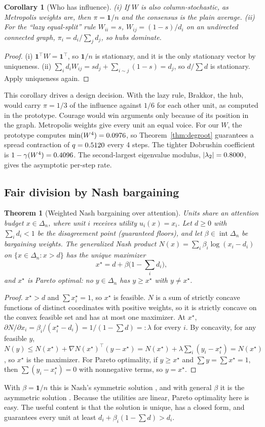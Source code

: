 \documentclass[11pt]{article}
\newtheorem{theorem}{Theorem}
\newtheorem{corollary}{Corollary}
\theoremstyle{definition}
\theoremstyle{remark}
\newcommand{\Simp}{\Delta}
\newcommand{\one}{\mathbf{1}}
\begin{document}
\begin{corollary}[Who has influence]\label{cor:pi}
(i) If $W$ is also column-stochastic, as Metropolis weights are, then $\pi=\one/n$ and the consensus is the plain average. (ii) For the ``lazy equal-split'' rule $W_{ii}=s$, $W_{ij}=(1-s)/d_i$ on an undirected connected graph, $\pi_i=d_i/\sum_jd_j$, so hubs dominate.
\end{corollary}
\begin{proof}
(i) $\one^\top W=\one^\top$, so $\one/n$ is stationary, and it is the only stationary vector by uniqueness. (ii) $\sum_id_iW_{ij}=sd_j+\sum_{i\sim j}(1-s)=d_j$, so $d/\sum d$ is stationary. Apply uniqueness again.
\end{proof}
This corollary drives a design decision. With the lazy rule, Brakkor, the hub, would carry $\pi=1/3$ of the influence against $1/6$ for each other unit, as computed in the prototype. Courage would win arguments only because of its position in the graph. Metropolis weights give every unit an equal voice. For our $W$, the prototype computes $\min(W^4)=0.0976$, so Theorem~\ref{thm:degroot} guarantees a spread contraction of $q=0.5120$ every 4 steps. The tighter Dobrushin coefficient is $1-\gamma(W^4)=0.4096$. The second-largest eigenvalue modulus, $|\lambda_2|=0.8000$, gives the asymptotic per-step rate.

\subsection{Fair division by Nash bargaining}
\begin{theorem}[Weighted Nash bargaining over attention]\label{thm:nash}
Units share an attention budget $x\in\Simp_n$, where unit $i$ receives utility $u_i(x)=x_i$. Let $d\ge0$ with $\sum_id_i<1$ be the disagreement point (guaranteed floors), and let $\beta\in\operatorname{int}\Simp_n$ be bargaining weights. The generalized Nash product $N(x)=\sum_i\beta_i\log(x_i-d_i)$ on $\{x\in\Simp_n:x>d\}$ has the unique maximizer
\[x^\star=d+\beta\Big(1-\sum_id_i\Big),\]
and $x^\star$ is Pareto optimal: no $y\in\Simp_n$ has $y\ge x^\star$ with $y\ne x^\star$.
\end{theorem}
\begin{proof}
$x^\star>d$ and $\sum x^\star_i=1$, so $x^\star$ is feasible. $N$ is a sum of strictly concave functions of distinct coordinates with positive weights, so it is strictly concave on the convex feasible set and has at most one maximizer. At $x^\star$, $\partial N/\partial x_i=\beta_i/(x^\star_i-d_i)=1/(1-\sum d)=:\lambda$ for every $i$. By concavity, for any feasible $y$, $N(y)\le N(x^\star)+\nabla N(x^\star)^\top(y-x^\star)=N(x^\star)+\lambda\sum_i(y_i-x^\star_i)=N(x^\star)$, so $x^\star$ is the maximizer. For Pareto optimality, if $y\ge x^\star$ and $\sum y=\sum x^\star=1$, then $\sum(y_i-x^\star_i)=0$ with nonnegative terms, so $y=x^\star$.
\end{proof}
With $\beta=\one/n$ this is Nash's symmetric solution \citep{nash1950}, and with general $\beta$ it is the asymmetric solution \citep{kalai1977}. Because the utilities are linear, Pareto optimality here is easy. The useful content is that the solution is unique, has a closed form, and guarantees every unit at least $d_i+\beta_i(1-\sum d)>d_i$.
\end{document}
